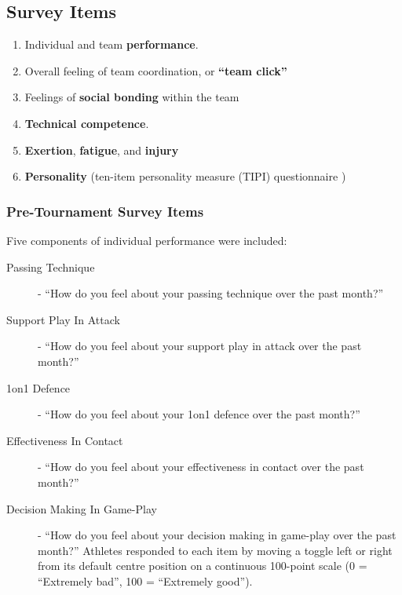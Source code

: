   \subsection{\label{app5:surveyItems}Survey Items}

  \begin{enumerate}
  \item Individual and team \textbf{performance}.
  \item Overall feeling of team coordination, or \textbf{``team click''}
  \item Feelings of \textbf{social bonding} within the team
  \item \textbf{Technical competence}.
  \item \textbf{Exertion}, \textbf{fatigue}, and \textbf{injury}
  \item \textbf{Personality} (ten-item personality measure (TIPI) questionnaire  \citep{Gosling2003})
  \end{enumerate}


    \subsubsection{\label{app5:surveyPre}Pre-Tournament Survey Items}


\myparagraph{\label{app5:performancePre}}

Five components of individual performance were included:
\begin{description}
\item[Passing Technique] - ``How do you feel about your passing technique over the past month?''
\item[Support Play In Attack] - ``How do you feel about your support play in attack over the past month?''
\item[1on1 Defence] - ``How do you feel about your 1on1 defence over the past month?''
\item[Effectiveness In Contact] - ``How do you feel about your effectiveness in contact over the past month?''
\item[Decision Making In Game-Play] - ``How do you feel about your decision making in game-play over the past month?''
Athletes responded to each item by moving a toggle left or right from its default centre position on a continuous 100-point scale (0 = ``Extremely bad'', 100 = ``Extremely good'').
\end{description}

